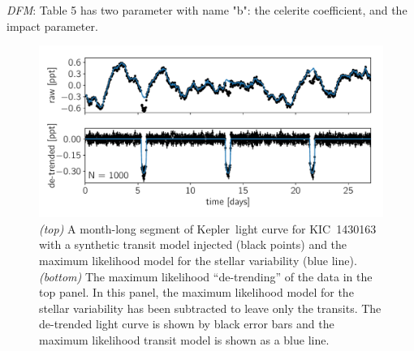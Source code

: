 \documentclass[manuscript, letterpaper]{aastex6}
\newcommand{\project}[1]{\textsf{#1}}
\newcommand{\kepler}{\project{Kepler}}
\newcommand{\figurelabel}[1]{\label{fig:#1}}
\newcommand{\todo}[3]{{\color{#2}\emph{#1}: #3}}
\newcommand{\dfmtodo}[1]{\todo{DFM}{red}{#1}}
\begin{document}
\newpage

\dfmtodo{Table 5 has two parameter with name "b":  the celerite coefficient,
and the impact parameter.}



\begin{figure}[!htbp]
\begin{center}
\includegraphics[width=\textwidth]{figures/transit/transit-ml.pdf}
    \caption{\emph{(top)} A month-long segment of \kepler\ light curve for
    KIC~1430163 with a synthetic transit model injected (black points) and the
    maximum likelihood model for the stellar variability
    (blue line).
    \emph{(bottom)} The maximum likelihood ``de-trending'' of the data in
    the top panel.
    In this panel, the maximum likelihood model for the stellar variability
    has been subtracted to leave only the transits.
    The de-trended light curve is shown by black error bars and the maximum
    likelihood transit model is shown as a blue line.
    \figurelabel{transit-ml}}
\end{center}
\end{figure}
\end{document}
